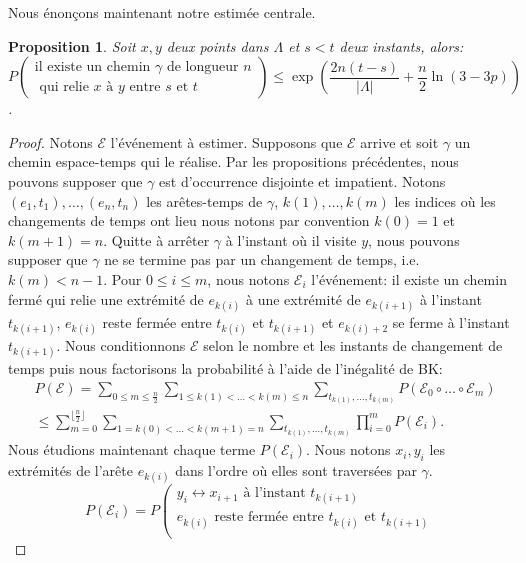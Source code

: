\documentclass[titlepage,a4paper,12pt]{article}
\newcounter{d}
\newcounter{t}
\newcounter{p}
\newcounter{c}
\newcounter{a}
\newcounter{l}
\newtheorem{prop}[p]{Proposition}
\begin{document}
Nous énonçons maintenant notre estimée centrale.
\begin{prop} Soit 
$x,y$ deux points dans $\Lambda$ et $s<t$ deux instants, alors:
$$P\left(\begin{array}{c}
\text{il existe un chemin }\gamma \text{ de longueur }n\\\text{ qui relie }x\text{ à }y \text{ entre }s\text{ et }t
\end{array}\right) \leqslant \exp\left(\frac{2n(t-s)}{|\Lambda|}+\frac{n}{2}\ln(3-3p)\right)$$.
\end{prop}
\begin{proof}
Notons $\mathcal{E}$ l'événement à estimer. Supposons que $\mathcal{E}$ arrive et soit $\gamma$ un chemin espace-temps qui le réalise. Par les propositions précédentes, nous pouvons supposer que $\gamma$ est d'occurrence disjointe et impatient. Notons $(e_1,t_1),\dots,(e_n,t_n)$ les arêtes-temps de $\gamma$, $k(1),\dots,k(m)$ les indices où les changements de temps ont lieu nous notons par convention $k(0) = 1$ et $k(m+1)=n$. Quitte à arrêter $\gamma$ à l'instant où il visite $y$, nous pouvons supposer que $\gamma$ ne se termine pas par un changement de temps, i.e. $k(m)< n-1$. Pour $0\leqslant i \leqslant m$, nous notons $\mathcal{E}_i$ l'événement: il existe un chemin fermé qui relie une extrémité de $e_{k(i)}$ à une extrémité de $e_{k(i+1)}$ à l'instant $t_{k(i+1)}$, $e_{k(i)}$ reste fermée entre $t_{k(i)}$ et $t_{k(i+1)}$ et $e_{k(i)+2}$ se ferme à l'instant $t_{k(i+1)}$. Nous conditionnons $\mathcal{E}$ selon le nombre et les instants de changement de temps puis nous factorisons la probabilité à l'aide de l'inégalité de BK:
\begin{align*}
&P(\mathcal{E})
= \sum_{0\leqslant m \leqslant \frac{n}{2}}\sum_{1\leqslant k(1)<\dots<k(m)\leqslant n}\sum_{t_{k(1)},\dots,t_{k(m)}}P(\mathcal{E}_0\circ\dots\circ \mathcal{E}_m)\\
&\leqslant \sum_{m=0}^{\lfloor\frac{n}{2}\rfloor}\sum_{1=k(0)<\dots<k(m+1)=n}\sum_{t_{k(1)},\dots,t_{k(m)}} \prod_{i=0}^mP(\mathcal{E}_i).
\end{align*}
Nous étudions maintenant chaque terme $P(\mathcal{E}_i)$. Nous notons $x_i,y_i$ les extrémités de l'arête $e_{k(i)}$ dans l'ordre où elles sont traversées par $\gamma$.
$$
P(\mathcal{E}_i) = P\left(\begin{array}{c}
y_i\longleftrightarrow x_{i+1}\text{ à l'instant }t_{k(i+1)}\\
e_{k(i)} \text{ reste fermée entre } t_{k(i)} \text{ et } t_{k(i+1)}\\

\end{array}$$
\end{proof}
\end{document}
